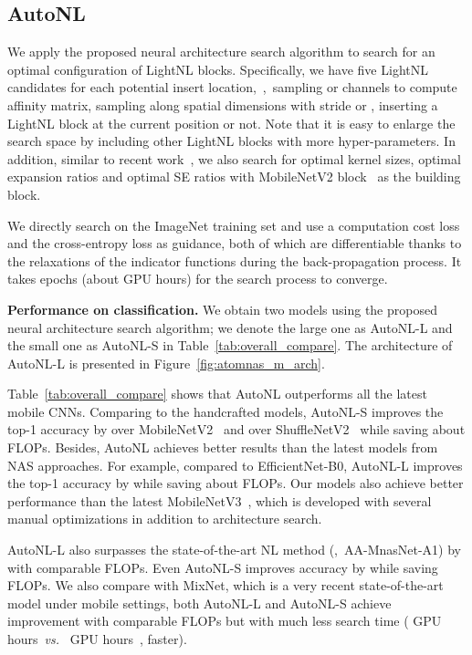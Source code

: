\documentclass[10pt,twocolumn,letterpaper]{article}
\begin{document}
\subsection{AutoNL}\label{sec:exp_search}
We apply the proposed neural architecture search algorithm to search for an optimal configuration of LightNL blocks. Specifically, we have five LightNL candidates for each potential insert location,~\ie,~sampling  or  channels to compute affinity matrix, sampling along spatial dimensions with stride  or , inserting a LightNL block at the current position or not. Note that it is easy to enlarge the search space by including other LightNL blocks with more hyper-parameters. In addition, similar to recent work~\cite{tan2019mnasnet,wu2019fbnet,han2019proxyless,stamoulis2019single}, we also search for optimal kernel sizes, optimal expansion ratios and optimal SE ratios with MobileNetV2 block~\cite{sandler2018mobilenetv2} as the building block.

We directly search on the ImageNet training set and use a computation cost loss and the cross-entropy loss as guidance, both of which are differentiable thanks to the relaxations of the indicator functions during the back-propagation process. It takes  epochs (about  GPU hours) for the search process to converge. 

\vspace{0.5ex}\noindent\textbf{Performance on classification.}
We obtain two models using the proposed neural architecture search algorithm; we denote the large one as AutoNL-L and the small one as AutoNL-S in Table~\ref{tab:overall_compare}. The architecture of AutoNL-L is presented in Figure~\ref{fig:atomnas_m_arch}.

Table~\ref{tab:overall_compare} shows that AutoNL outperforms all the latest mobile CNNs. Comparing to the handcrafted models, AutoNL-S improves the top-1 accuracy by  over MobileNetV2~\cite{sandler2018mobilenetv2} and  over ShuffleNetV2~\cite{ma2018shufflenet} while saving about  FLOPs. Besides, AutoNL achieves better results than the latest models from NAS approaches. For example, compared to EfficientNet-B0, AutoNL-L improves the top-1 accuracy by  while saving about  FLOPs. Our models also achieve better performance than the latest MobileNetV3~\cite{howard2019searching}, which is developed with several manual optimizations in addition to architecture search.

AutoNL-L also surpasses the state-of-the-art NL method (\ie,~AA-MnasNet-A1) by  with comparable FLOPs. Even AutoNL-S improves accuracy by  while saving  FLOPs. We also compare with MixNet, which is a very recent state-of-the-art model under mobile settings, both AutoNL-L and AutoNL-S achieve  improvement with comparable FLOPs but with much less search time ( GPU hours~\emph{vs.}~ GPU hours~\cite{wu2019fbnet},  faster).
\end{document}
